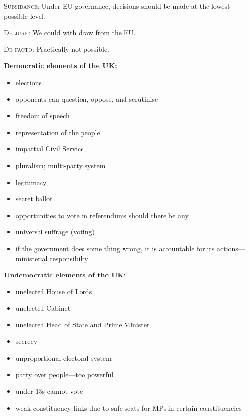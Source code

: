 \documentclass[a4paper,12pt]{article}
\begin{document}
	
	\textsc{Subsidance}: Under EU governance, decisions should be made at the lowest possible level.
	
	\textsc{De jure}: We could with draw from the EU.
	
	\textsc{De facto}: Practically not possible.
	
	\textbf{Democratic elements of the UK:}
	
	\begin{itemize}
		\item{elections}
		\item{opponents can question, oppose, and scrutinise}
		\item{freedom of speech}
		\item{representation of the people}
		\item{impartial Civil Service}
		\item{pluralism; multi-party system}
		\item{legitimacy}
		\item{secret ballot}
		\item{opportunities to vote in referendums should there be any}
		\item{universal suffrage (voting)}
		\item{if the government does some thing wrong, it is accountable for its actions---ministerial responsibilty}
	\end{itemize}
	
	\textbf{Undemocratic elements of the UK:}
	
	\begin{itemize}
		\item{unelected House of Lords}
		\item{unelected Cabinet}
		\item{unelected Head of State and Prime Minister}
		\item{secrecy}
		\item{unproportional electoral system}
		\item{party over people---too powerful}
		\item{under 18s cannot vote}
		\item{weak constituency links due to safe seats for MPs in certain constituencies}	
	\end{itemize}
\end{document}
